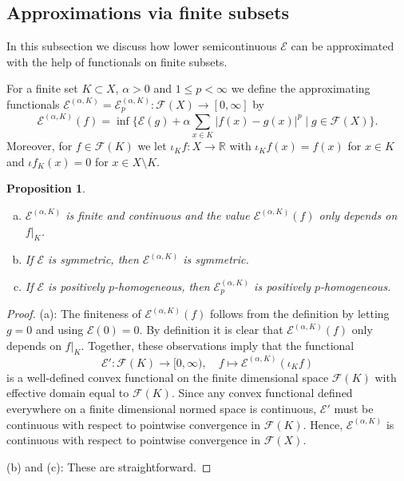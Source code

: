 \documentclass[a4paper,11pt,reqno]{amsart}
\newtheorem{proposition}[lemma]{Proposition}
\theoremstyle{definition}
\numberwithin{equation}{section}
\newcommand{\cE}{{\mathcal E}}
\newcommand{\cF}{{\mathcal F}}
\newcommand{\R}{{\mathbb R}}
\newcommand{\1}{\mathds{1}}
\begin{document}
 

\subsection{Approximations via finite subsets} \label{subsection:finite approximation}

In this subsection we discuss how lower semicontinuous $\cE$ can be approximated with the help of functionals on finite subsets.  


For a finite set $K \subset X$, $\alpha > 0$ and $1 \leq p < \infty$ we define the approximating functionals $\cE^{(\alpha,K)} =\cE^{(\alpha,K)}_p \colon \cF(X) \to [0,\infty]$ by
%
$$\cE^{(\alpha,K)}(f) = \inf \{\cE(g) + \alpha \sum_{x \in K} |f(x) - g(x)|^p \mid g \in \cF(X)\}. $$
%
Moreover, for $f \in \cF(K)$ we let $\iota_K f \colon X \to \R$ with $\iota_K f(x) = f(x)$ for $x \in K$ and $\iota f_K(x) = 0$ for $x \in X \setminus K$.



\begin{proposition}\label{proposition:basic properties approximating forms}
\begin{enumerate}[(a)]
 \item   $\cE^{(\alpha,K)}$ is finite and continuous and the value $\cE^{(\alpha,K)}(f)$ only depends on $f|_K$. 
  
 \item If $\cE$ is symmetric, then $\cE^{(\alpha,K)}$ is symmetric. 
 \item If $\cE$ is positively $p$-homogeneous, then $\cE^{(\alpha,K)}_p$ is positively $p$-homogeneous.
\end{enumerate}
\end{proposition}
\begin{proof}
 (a): The finiteness of $\cE^{(\alpha,K)}(f)$ follows from the definition by letting $g = 0$ and using $\cE(0) = 0$. By definition it is clear that $\cE^{(\alpha,K)}(f)$ only depends on $f|_K$. Together, these observations imply that the functional 
 $$\cE' \colon \cF(K) \to [0,\infty),\quad f \mapsto \cE^{(\alpha,K)}(\iota_K f)$$
 is a well-defined  convex functional on the finite dimensional space $\cF(K)$ with effective domain equal to $\cF(K)$. Since any convex functional defined everywhere on a finite dimensional normed space is continuous, $\cE'$ must be continuous with respect to pointwise convergence in $\cF(K)$. Hence,  $\cE^{(\alpha,K)}$ is continuous with respect to pointwise convergence in $\cF(X)$. 
 
 (b) and (c): These are straightforward. 
\end{proof}
\end{document}
